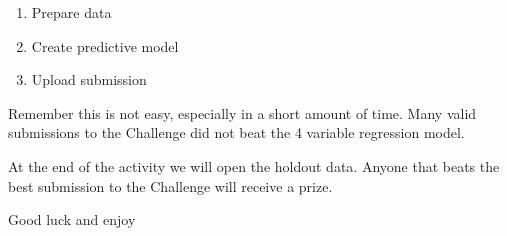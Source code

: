 \documentclass[aspectratio=169]{beamer}
\begin{document}
\begin{frame}

\begin{enumerate}
\item Prepare data
\item Create predictive model
\item Upload submission
\end{enumerate}

\end{frame}
\begin{frame}

\begin{center}
\LARGE Remember this is not easy, especially in a short amount of time.  Many valid submissions to the Challenge did not beat the 4 variable regression model.
\end{center}

\end{frame}
\begin{frame}

\begin{center}
\LARGE At the end of the activity we will open the holdout data. Anyone that beats the best submission to the Challenge will receive a prize.
\end{center}

\end{frame}
\begin{frame}

\begin{center}
\LARGE Good luck and enjoy
\end{center}

\end{frame}
\end{document}
